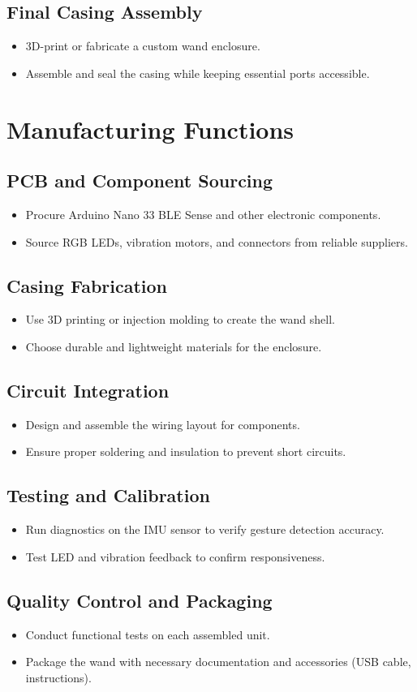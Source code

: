 \subsection{Final Casing Assembly}
\begin{itemize}
	\item 3D-print or fabricate a custom wand enclosure.
	\item Assemble and seal the casing while keeping essential ports accessible.
\end{itemize}

\section{Manufacturing Functions}

\subsection{PCB and Component Sourcing}
\begin{itemize}
	\item Procure Arduino Nano 33 BLE Sense and other electronic components.
	\item Source RGB LEDs, vibration motors, and connectors from reliable suppliers.
\end{itemize}

\subsection{Casing Fabrication}
\begin{itemize}
	\item Use 3D printing or injection molding to create the wand shell.
	\item Choose durable and lightweight materials for the enclosure.
\end{itemize}

\subsection{Circuit Integration}
\begin{itemize}
	\item Design and assemble the wiring layout for components.
	\item Ensure proper soldering and insulation to prevent short circuits.
\end{itemize}

\subsection{Testing and Calibration}
\begin{itemize}
	\item Run diagnostics on the IMU sensor to verify gesture detection accuracy.
	\item Test LED and vibration feedback to confirm responsiveness.
\end{itemize}

\subsection{Quality Control and Packaging}
\begin{itemize}
	\item Conduct functional tests on each assembled unit.
	\item Package the wand with necessary documentation and accessories (USB cable, instructions).
\end{itemize}

